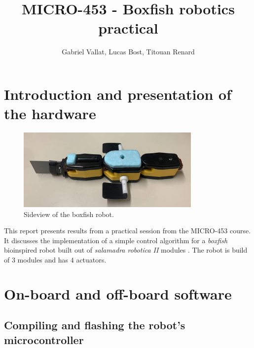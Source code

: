 \documentclass[11pt]{article}
\title{MICRO-453 - Boxfish robotics practical}
\author{Gabriel Vallat, Lucas Bost, Titouan Renard}
\begin{document}
\maketitle
\tableofcontents
\section{Introduction and presentation of the hardware}

\begin{figure}[h!]
    \centering
    \includegraphics[width=0.8\textwidth]{figures/side.jpg}
    \caption{Sideview of the boxfish robot.}
    \label{boxfish}
\end{figure}

This report presents results from a practical session from the MICRO-453 course. It discusses the implementation of a simple control algorithm for a \textit{boxfish} bioinspired robot built out of \textit{salamadra robotica II} modules \cite{salamadra_robotica_2}. The robot is build of $3$ modules and has $4$ actuators. 

\section{On-board and off-board software}


\subsection{Compiling and flashing the robot's microcontroller}
\end{document}

